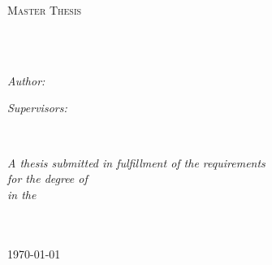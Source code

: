 \documentclass[
11pt, %
english, %
singlespacing, %
headsepline, %
]{MastersThesis} %
\author{Janik V. \textsc{Hrubant}} %
\theoremstyle{definition}
\theoremstyle{plain}
\begin{document}
\frontmatter %

\pagestyle{plain} %


\begin{titlepage}
\begin{center}

\vspace*{.06\textheight}
{\scshape\LARGE \univname\par}\vspace{1.5cm} %
\textsc{\Large Master Thesis}\\[0.5cm] %

\HRule \\[0.4cm] %
{\huge \bfseries \ttitle\par}\vspace{0.4cm} %
\HRule \\[1.5cm] %
 
\begin{minipage}[t]{0.4\textwidth}
\begin{flushleft} \large
\emph{Author:}\\
\authorname %
\end{flushleft}
\end{minipage}
\begin{minipage}[t]{0.4\textwidth}
\begin{flushright} \large
\emph{Supervisors:} \\
\supname %
\end{flushright}
\end{minipage}\\[3cm]
 
\vfill

\large \textit{A thesis submitted in fulfillment of the requirements\\ for the degree of \degreename}\\[0.3cm] %
\textit{in the}\\[0.4cm]
\groupname\\\deptname\\[2cm] %
 
\vfill

{\large \today}\\[4cm] %
 
\vfill
\end{center}
\end{titlepage}
\end{document}
